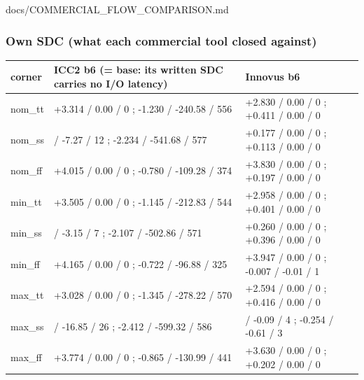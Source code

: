 \begin{relocated}{docs/COMMERCIAL_FLOW_COMPARISON.md}
{}

\subsubsection{Own SDC (what each commercial tool closed against)}\label{tm:pd:commercial-flow-comparison:43-own-sdc-what-each-commercial-tool-closed-against}

{
\begin{longtable}[]{@{}
  >{\raggedright\arraybackslash}p{}
  >{\raggedright\arraybackslash}p{}
  >{\raggedright\arraybackslash}p{}@{}}
\toprule\noalign{}
\begin{minipage}[b]{\linewidth}\raggedright
corner
\end{minipage} & \begin{minipage}[b]{\linewidth}\raggedright
ICC2 b6 (= base: its written SDC carries no I/O latency)
\end{minipage} & \begin{minipage}[b]{\linewidth}\raggedright
Innovus b6
\end{minipage} \\
\midrule\noalign{}
\endhead
\bottomrule\noalign{}
\endlastfoot
nom\_tt & +3.314 / 0.00 / 0 ; -1.230 / -240.58 / 556 & +2.830 / 0.00 / 0
; +0.411 / 0.00 / 0 \\
nom\_ss & -1.594 / -7.27 / 12 ; -2.234 / -541.68 / 577 & +0.177 / 0.00 /
0 ; +0.113 / 0.00 / 0 \\
nom\_ff & +4.015 / 0.00 / 0 ; -0.780 / -109.28 / 374 & +3.830 / 0.00 / 0
; +0.197 / 0.00 / 0 \\
min\_tt & +3.505 / 0.00 / 0 ; -1.145 / -212.83 / 544 & +2.958 / 0.00 / 0
; +0.401 / 0.00 / 0 \\
min\_ss & -1.079 / -3.15 / 7 ; -2.107 / -502.86 / 571 & +0.260 / 0.00 /
0 ; +0.396 / 0.00 / 0 \\
min\_ff & +4.165 / 0.00 / 0 ; -0.722 / -96.88 / 325 & +3.947 / 0.00 / 0
; -0.007 / -0.01 / 1 \\
max\_tt & +3.028 / 0.00 / 0 ; -1.345 / -278.22 / 570 & +2.594 / 0.00 / 0
; +0.416 / 0.00 / 0 \\
max\_ss & -2.268 / -16.85 / 26 ; -2.412 / -599.32 / 586 & -0.050 / -0.09
/ 4 ; -0.254 / -0.61 / 3 \\
max\_ff & +3.774 / 0.00 / 0 ; -0.865 / -130.99 / 441 & +3.630 / 0.00 / 0
; +0.202 / 0.00 / 0 \\
\end{longtable}
}


\end{relocated}
